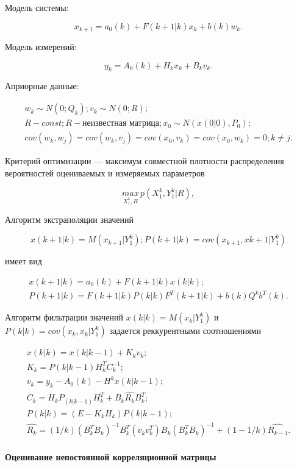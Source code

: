 \documentclass[a4paper,12pt]{article}
\begin{document}
Модель системы:

\[ x_{k+1} = a_0(k) + F(k+1|k) x_k + b(k) w_k . \]

Модель измерений:

\[ y_k = A_0(k) + H_k x_k + B_k v_k . \]

Априорные данные:

\[ 
\begin{array}{l}
	w_k \sim N(0; Q_k); v_k \sim N(0; R);\\
	R - const; R - \mbox{неизвестная матрица}; x_0 \sim N(x(0|0), P_0);\\
	cov(w_k, w_j) = cov(w_k, v_j) = cov(x_0, v_k) = cov(x_0, w_k) = 0; k \ne j.
\end{array}
\]

Критерий оптимизации --- максимум совместной плотности распределения
вероятностей оцениваемых и измеряемых параметров

\[ \underset{X_1^k, R}{max}\, p(X_1^k, Y_1^k | R), \]

Алгоритм экстраполяции значений

\[ x(k+1|k) = M(x_{k+1}|Y^k_1); P(k+1|k) = cov(x_{k+1}, x{k+1} | Y^k_1) \]

имеет вид

\[
\begin{array}{l}
	x(k+1|k) = a_0(k) + F(k+1|k) x(k|k);\\
	P(k+1|k) = F(k+1|k) P(k|k) F^T(k+1|k) + b(k) Q^k b^T(k).
\end{array}
\]

Алгоритм фильтрации значений $x(k|k) = M(x_k|Y^k_1)$ и 
$P(k|k) = cov(x_k, x_k | Y^k_1)$ задается реккурентными соотношениями

\[
\begin{array}{l}
	x(k|k) = x(k|k-1) + K_k v_k;\\
	K_k = P(k|k-1) H^T_k C^{-1}_k;\\
	v_k = y_k - A_0(k) - H^k x(k|k-1);\\
	C_k = H_k P_(k|k-1) H^T_k + B_k \hat{R_k} B^T_k;\\
	P(k|k) = (E - K_k H_k) P(k|k-1);\\
	\hat{R_k} = (1/k) (B^T_k B_k)^{-1} B^T_k (v_k v^T_k) B_k (B^T_k B_k)^{-1} +
	(1 - 1/k) \hat{R_{k-1}} .
\end{array}
\]

\newpage

\paragraph{Оценивание непостоянной корреляционной матрицы\\}
\end{document}
